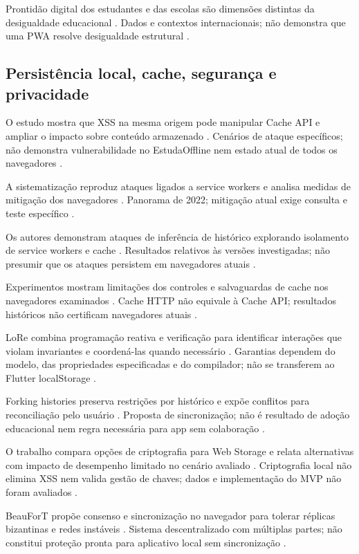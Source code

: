 Prontidão digital dos estudantes e das escolas são dimensões distintas da desigualdade educacional \citep{werfhorst2022}. Dados e contextos internacionais; não demonstra que uma PWA resolve desigualdade estrutural \citep{werfhorst2022}.

\subsection{Persistência local, cache, segurança e privacidade}

O estudo mostra que XSS na mesma origem pode manipular Cache API e ampliar o impacto sobre conteúdo armazenado \citep{OS01}. Cenários de ataque específicos; não demonstra vulnerabilidade no EstudaOffline nem estado atual de todos os navegadores \citep{OS01}.

A sistematização reproduz ataques ligados a service workers e analisa medidas de mitigação dos navegadores \citep{OS02}. Panorama de 2022; mitigação atual exige consulta e teste específico \citep{OS02}.

Os autores demonstram ataques de inferência de histórico explorando isolamento de service workers e cache \citep{OS03}. Resultados relativos às versões investigadas; não presumir que os ataques persistem em navegadores atuais \citep{OS03}.

Experimentos mostram limitações dos controles e salvaguardas de cache nos navegadores examinados \citep{OS06}. Cache HTTP não equivale à Cache API; resultados históricos não certificam navegadores atuais \citep{OS06}.

LoRe combina programação reativa e verificação para identificar interações que violam invariantes e coordená-las quando necessário \citep{OS07}. Garantias dependem do modelo, das propriedades especificadas e do compilador; não se transferem ao Flutter localStorage \citep{OS07}.

Forking histories preserva restrições por histórico e expõe conflitos para reconciliação pelo usuário \citep{OS08}. Proposta de sincronização; não é resultado de adoção educacional nem regra necessária para app sem colaboração \citep{OS08}.

O trabalho compara opções de criptografia para Web Storage e relata alternativas com impacto de desempenho limitado no cenário avaliado \citep{OS09}. Criptografia local não elimina XSS nem valida gestão de chaves; dados e implementação do MVP não foram avaliados \citep{OS09}.

BeauForT propõe consenso e sincronização no navegador para tolerar réplicas bizantinas e redes instáveis \citep{OS10}. Sistema descentralizado com múltiplas partes; não constitui proteção pronta para aplicativo local sem sincronização \citep{OS10}.

